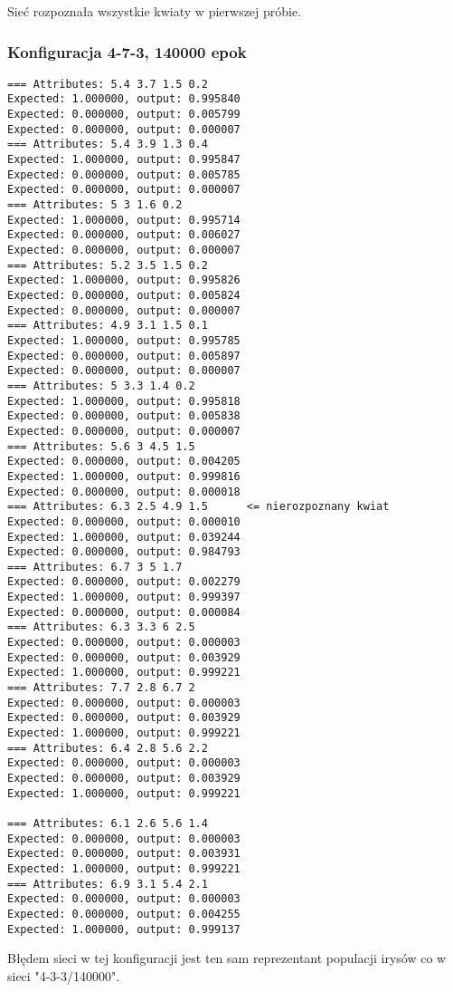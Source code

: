 \documentclass{classrep}
\begin{document}
Sieć rozpoznała wszystkie kwiaty w pierwszej próbie.
\newpage
\subsubsection{Konfiguracja 4-7-3, 140000 epok}
\begin{lstlisting}[basicstyle=\small]
=== Attributes: 5.4 3.7 1.5 0.2 
Expected: 1.000000, output: 0.995840
Expected: 0.000000, output: 0.005799
Expected: 0.000000, output: 0.000007
=== Attributes: 5.4 3.9 1.3 0.4 
Expected: 1.000000, output: 0.995847
Expected: 0.000000, output: 0.005785
Expected: 0.000000, output: 0.000007
=== Attributes: 5 3 1.6 0.2 
Expected: 1.000000, output: 0.995714
Expected: 0.000000, output: 0.006027
Expected: 0.000000, output: 0.000007
=== Attributes: 5.2 3.5 1.5 0.2 
Expected: 1.000000, output: 0.995826
Expected: 0.000000, output: 0.005824
Expected: 0.000000, output: 0.000007
=== Attributes: 4.9 3.1 1.5 0.1 
Expected: 1.000000, output: 0.995785
Expected: 0.000000, output: 0.005897
Expected: 0.000000, output: 0.000007
=== Attributes: 5 3.3 1.4 0.2 
Expected: 1.000000, output: 0.995818
Expected: 0.000000, output: 0.005838
Expected: 0.000000, output: 0.000007
=== Attributes: 5.6 3 4.5 1.5 
Expected: 0.000000, output: 0.004205
Expected: 1.000000, output: 0.999816
Expected: 0.000000, output: 0.000018
=== Attributes: 6.3 2.5 4.9 1.5      <= nierozpoznany kwiat
Expected: 0.000000, output: 0.000010
Expected: 1.000000, output: 0.039244
Expected: 0.000000, output: 0.984793
=== Attributes: 6.7 3 5 1.7 
Expected: 0.000000, output: 0.002279
Expected: 1.000000, output: 0.999397
Expected: 0.000000, output: 0.000084
=== Attributes: 6.3 3.3 6 2.5 
Expected: 0.000000, output: 0.000003
Expected: 0.000000, output: 0.003929
Expected: 1.000000, output: 0.999221
=== Attributes: 7.7 2.8 6.7 2 
Expected: 0.000000, output: 0.000003
Expected: 0.000000, output: 0.003929
Expected: 1.000000, output: 0.999221
=== Attributes: 6.4 2.8 5.6 2.2 
Expected: 0.000000, output: 0.000003
Expected: 0.000000, output: 0.003929
Expected: 1.000000, output: 0.999221

=== Attributes: 6.1 2.6 5.6 1.4 
Expected: 0.000000, output: 0.000003
Expected: 0.000000, output: 0.003931
Expected: 1.000000, output: 0.999221
=== Attributes: 6.9 3.1 5.4 2.1 
Expected: 0.000000, output: 0.000003
Expected: 0.000000, output: 0.004255
Expected: 1.000000, output: 0.999137
\end{lstlisting}

Błędem sieci w tej konfiguracji jest ten sam reprezentant populacji irysów co w sieci "4-3-3/140000".
\end{document}
